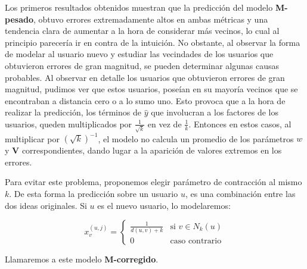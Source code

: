 \documentclass[hidelinks,12pt,a4paper]{book}
\theoremstyle{plain}
\theoremstyle{definition}
\begin{document}
Los primeros resultados obtenidos muestran que la predicción del modelo \textbf{M-pesado}, obtuvo errores extremadamente altos en ambas métricas y una tendencia clara de aumentar a la hora de considerar más vecinos, lo cual al principio parecería ir en contra de la intuición. No obstante, al observar la forma de modelar al usuario nuevo y estudiar las vecindades de los usuarios que obtuvieron errores de gran magnitud, se pueden determinar algunas causas probables. Al observar en detalle los usuarios que obtuvieron errores de gran magnitud, pudimos ver que estos usuarios, poseían en su mayoría vecinos que se encontraban a distancia cero o a lo sumo uno. Esto provoca que a la hora de realizar la predicción, los términos de $\hat{y}$ que involucran a los factores de los usuarios, queden multiplicados por $\frac{1}{\sqrt{k}}$ en vez de $\frac{1}{k}$. Entonces en estos casos, al multiplicar por $(\sqrt{k})^{-1}$, el modelo no calcula un promedio de los parámetros $w$ y $\textbf{V}$ correspondientes, dando lugar a la aparición de valores extremos en los errores.

Para evitar este problema, proponemos elegir parámetro de contracción al mismo $k$. De esta forma la predicción sobre un usuario $u$, es una combinación entre las dos ideas originales. Si $u$ es el nuevo usuario, lo modelaremos: 

\begin{equation}
\label{prop3}
x_v^{(u,j)}=
\begin{cases}
\frac{1}{d(u,v)+ k} &\text{si } v\in N_k(u) \\
0 &\text{caso contrario}
\end{cases}
\end{equation}

Llamaremos a este modelo \textbf{M-corregido}.
\end{document}

